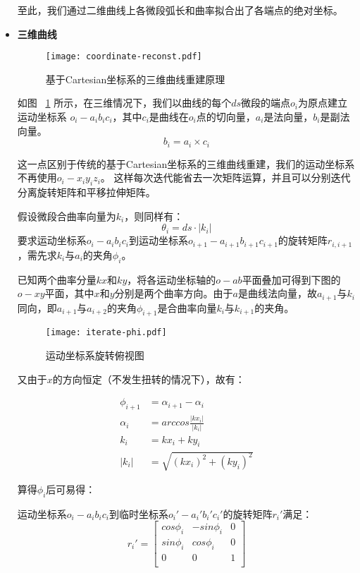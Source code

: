 \begin{itemize}
至此，我们通过二维曲线上各微段弧长和曲率拟合出了各端点的绝对坐标。

\item \textbf{三维曲线} \\

\begin{figure}[H]
\centering
\texttt{[image: coordinate-reconst.pdf]}
\caption{基于Cartesian坐标系的三维曲线重建原理}
\label{fig:coordinate-reconst} 
\end{figure}


如图 ~\ref{fig:coordinate-reconst} 所示，在三维情况下，我们以曲线的每个$ds$微段的端点$o_i$为原点建立运动坐标系\cite{three-dimensional-curve} $o_i-a_ib_ic_i$，其中$c_i$是曲线在$o_i$点的切向量，$a_i$是法向量，$b_i$是副法向量。
\begin{equation}
b_i = a_i \times c_i
\end{equation}

这一点区别于传统的基于Cartesian坐标系的三维曲线重建，我们的运动坐标系不再使用$o_i-x_iy_iz_i$。
这样每次迭代能省去一次矩阵运算，并且可以分别迭代分离旋转矩阵和平移拉伸矩阵。

假设微段合曲率向量为$k_i$，则同样有：
\begin{equation}
\theta_i = ds\cdot |k_i|
\end{equation}
要求运动坐标系$o_i-a_ib_ic_i$到运动坐标系$o_{i+1}-a_{i+1}b_{i+1}c_{i+1}$的旋转矩阵$r_{i, i+1}$，需先求$k_i$与$a_i$的夹角$\phi_i$。

已知两个曲率分量$kx$和$ky$，将各运动坐标轴的$o-ab$平面叠加可得到下图的$o-xy$平面，其中$x$和$y$分别是两个曲率方向。由于$a$是曲线法向量，故$a_{i+1}$与$k_i$同向，即$a_{i+1}$与$a_{i+2}$的夹角$\phi_{i+1}$是合曲率向量$k_i$与$k_{i+1}$的夹角。

\begin{figure}[H]
\centering
\texttt{[image: iterate-phi.pdf]}
\caption{运动坐标系旋转俯视图}
\label{fig:iterate-phi} 
\end{figure}

又由于$x$的方向恒定（不发生扭转的情况下），故有：

\begin{align}
\phi_{i+1} &= \alpha_{i+1} - \alpha_i \\
\alpha_i &= arccos\frac{|kx_i|}{|k_i|} \\
k_i &= kx_i + ky_i \\
|k_i| &= \sqrt{(kx_i)^2 + (ky_i)^2}
\end{align}

算得$\phi_i$后可易得：

运动坐标系$o_i-a_ib_ic_i$到临时坐标系$o_i'-a_i'b_i'c_i'$的旋转矩阵$r_i'$满足：
    \begin{equation}
    r_i' = \left[
            \begin{matrix}
            cos\phi_i & -sin\phi_i & 0\\
            sin\phi_i & cos\phi_i & 0\\
            0 & 0 & 1\\
            \end{matrix}
        \right]
    \end{equation}
    

\end{itemize}
